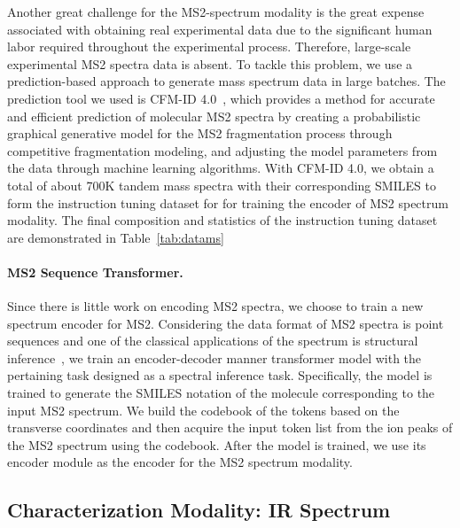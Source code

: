 Another great challenge for the MS2-spectrum modality is the great expense associated with obtaining real experimental data due to the significant human labor required throughout the experimental process. Therefore, large-scale experimental MS2 spectra data is absent. To tackle this problem, we use a prediction-based approach to generate mass spectrum data in large batches. The prediction tool we used is CFM-ID 4.0~\cite{cfmid4.0}, which provides a method for accurate and efficient prediction of molecular MS2 spectra by creating a probabilistic graphical generative model for the MS2 fragmentation process through competitive fragmentation modeling, and adjusting the model parameters from the data through machine learning algorithms. With CFM-ID 4.0, we obtain a total of about 700K tandem mass spectra with their corresponding SMILES to form the instruction tuning dataset for for training the encoder of MS2 spectrum modality. The final composition and statistics of the instruction tuning dataset are demonstrated in Table~\ref{tab:datams}

\paragraph{MS2 Sequence Transformer.}

Since there is little work on encoding MS2 spectra, we choose to train a new spectrum encoder for MS2. Considering the data format of MS2 spectra is point sequences and one of the classical applications of the spectrum is structural inference~\cite{Demartini13}, we train an encoder-decoder manner transformer model with the pertaining task designed as a spectral inference task. Specifically, the model is trained to generate the SMILES notation of the molecule corresponding to the input MS2 spectrum. We build the codebook of the tokens based on the transverse coordinates and then acquire the input token list from the ion peaks of the MS2 spectrum using the codebook. After the model is trained, we use its encoder module as the encoder for the MS2 spectrum modality.

\subsection{Characterization Modality: IR Spectrum}\label{sec:ir}


